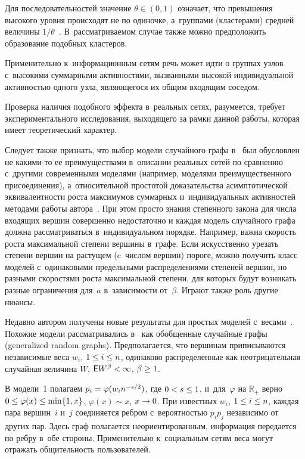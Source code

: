 \begin{multicols}{2}
Для последовательностей значение $\theta\in (0,1)$ означает,
что превышения высокого уровня происходят не по одиночке, а~группами
(кластерами) средней величины $1/\theta$~\cite[\S 8.1]{EKM}.
В~рассматриваемом случае также можно
предположить образование подобных кластеров.

Применительно к~информационным сетям
речь может идти о группах узлов с~высокими суммарными активностями, вызванными
высокой индивидуальной активностью одного узла, являющегося их
общим входящим соседом.

Проверка наличия подобного эффекта в~реальных сетях, разумеется,
требует экспериментального исследования, выходящего
за рамки данной работы, которая имеет теоретический характер.

Следует также признать, что выбор модели случайного графа
в~\cite{Leb4} был обусловлен
не ка\-ки\-ми-то ее преимуществами в~описании реальных сетей по сравнению с~другими
современными моделями (например, моделями преимущественного присоединения),
а~относительной простотой доказательства асимптотической эквивалентности роста
максимумов суммарных и~индивидуальных активностей методами работы автора~\cite{Leb-2005c}.
При этом просто знания степенного закона для числа входящих вершин совершенно недостаточно
и каждая модель случайного графа должна рассматриваться в~индивидуальном порядке. Например,
важна скорость роста максимальной степени вершины в~графе. Если искусственно урезать степени
вершин на растущем (c~числом вершин) пороге, можно получить класс моделей с~одинаковыми предельными
распределениями степеней вершин, но разными скоростями роста максимальной степени,
для которых будут возникать разные ограничения для~$a$ в~зависимости от~$\beta$.
Играют также роль другие нюансы.

Недавно автором получены новые результаты для простых моделей с~весами~\cite{Leb-Nc}.
Похожие модели рассматривались
в~\cite[гл. 6]{Hofstad} как обобщенные случайные графы
(generalized random graphs). Предполагается,
что вершинам приписываются независимые веса $w_i$, $1\hm\le i\hm\le n$,
одинаково распределенные как
неотрицательная случайная величина $W$, ${\sf E}W^\beta\hm<\infty$, $\beta\hm\ge 1$.

В модели~1 полагаем $p_i\hm=\varphi(w_in^{-s/2})$, где $0\hm<s\hm\le 1$,
и~для~$\varphi$ на
${\mathbb{R}}_+$ верно $0\hm\le \varphi(x)\hm\le \min\{1,x\}$, $\varphi(x)\sim x$,
$x\hm\to 0$.
При известных $w_i$, $1\hm\le i\hm\le n$, каждая пара вершин~$i$ и~$j$
соединяется реб\-ром
с~вероятностью $p_ip_j$ независимо от других пар. Здесь граф полагается
неориентированным, информация передается по реб\-ру в~обе стороны. Применительно
к~социальным сетям веса могут отражать общительность пользователей.


\end{multicols}
